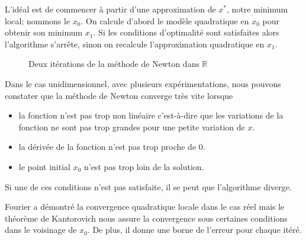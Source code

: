 %
%
%
%
%
L'id\'eal est de commencer \`a partir d'une approximation de $x^*$, notre minimum local; nommons le $x_0$.
On calcule d'abord le mod\`ele quadratique en $x_0$ pour obtenir son minimum $x_1$.
Si les conditions d'optimalit\'e sont satisfaites alors l'algorithme s'arrête, sinon on recalcule l'approximation
quadratique en $x_1$.

\begin{figure}
\caption{Deux it\'erations de la m\'ethode de Newton dans $\mathbb{R}$}
\begin{center}
\end{center}
\label{fig:Newton}
\end{figure}
%
Dans le cas unidimensionnel, avec plusieurs exp\'erimentations, nous pouvons constater que
la m\'ethode de Newton converge tr\`es vite lorsque
\begin{itemize}
\item la fonction n'est pas trop non lin\'eaire c'est-\`a-dire que les variations de la fonction ne sont pas trop grandes
pour une petite variation de $x$.
\item la d\'eriv\'ee de la fonction n'est pas trop proche de $0$.
\item le point initial $x_0$ n'est pas trop loin de la solution.
\end{itemize}
Si une de ces conditions n'est pas satisfaite, il se peut que l'algorithme diverge.





Fourier \cite{convnewton} a d\'emontr\'e la convergence quadratique locale dans le cas r\'eel mais
le th\'eor\`eme de Kantorovich nous assure la convergence sous certaines conditions dans le
voisinage de $x_0$. De plus, il donne une borne de l'erreur pour chaque it\'er\'e.

